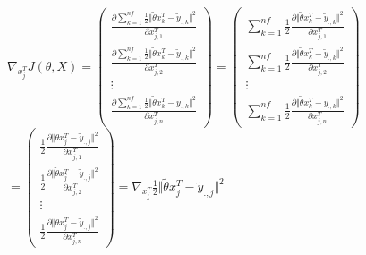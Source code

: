 \documentclass[a4paper,10pt]{article}
\begin{document}
\subsection{}  
\label{P1}  
$\nabla_{x_{j}^T} J(\theta, X)=  
\begin{pmatrix}  
\displaystyle\frac{\partial \displaystyle\sum_{k=1}^{nf}\frac{1}{2}\Vert\tilde{\theta}x_{k}^{T}-\tilde{y}_{.,k}\Vert^{2}}{\partial x_{j,1}^{T}}\\  
\displaystyle\frac{\partial \displaystyle\sum_{k=1}^{nf}\frac{1}{2}\Vert\tilde{\theta}x_{k}^{T}-\tilde{y}_{.,k}\Vert^{2}}{\partial x_{j,2}^{T}}\\  
\vdots\\  
\displaystyle\frac{\partial \displaystyle\sum_{k=1}^{nf}\frac{1}{2}\Vert\tilde{\theta}x_{k}^{T}-\tilde{y}_{.,k}\Vert^{2}}{\partial x_{j,n}^{T}}  
\end{pmatrix}  
=  
\begin{pmatrix}  
\displaystyle\sum_{k=1}^{nf}  
\frac{1}{2}\frac{\partial\Vert\tilde{\theta}x_{k}^{T}-\tilde{y}_{.,k}\Vert^{2}}{\partial x_{j,1}^{T}}\\  
\displaystyle\sum_{k=1}^{nf}  
\frac{1}{2}\frac{\partial\Vert\tilde{\theta}x_{k}^{T}-\tilde{y}_{.,k}\Vert^{2}}{\partial x_{j,2}^{T}}\\  
\vdots\\  
\displaystyle\sum_{k=1}^{nf}  
\frac{1}{2}\frac{\partial\Vert\tilde{\theta}x_{k}^{T}-\tilde{y}_{.,k}\Vert^{2}}{\partial x_{j,n}^{T}}  
\end{pmatrix}$\\  
$  
=  
\begin{pmatrix}  
\displaystyle  
\frac{1}{2}\frac{\partial\Vert\tilde{\theta}x_{j}^{T}-\tilde{y}_{.,j}\Vert^{2}}{\partial x_{j,1}^{T}}\\  
\displaystyle  
\frac{1}{2}\frac{\partial\Vert\tilde{\theta}x_{j}^{T}-\tilde{y}_{.,j}\Vert^{2}}{\partial x_{j,2}^{T}}\\  
\vdots\\  
\displaystyle  
\frac{1}{2}\frac{\partial\Vert\tilde{\theta}x_{j}^{T}-\tilde{y}_{.,j}\Vert^{2}}{\partial x_{j,n}^{T}}  
\end{pmatrix}  
=  
\displaystyle  
\nabla_{x_{j}^T}\frac{1}{2}\Vert\tilde{\theta}x_{j}^{T}-\tilde{y}_{.,j}\Vert^{2}  
$  
\end{document}
